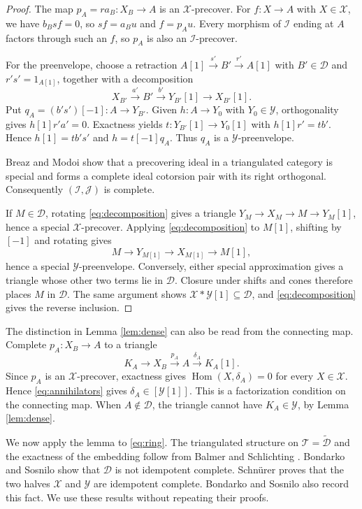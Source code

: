 \documentclass[11pt,a4paper,reqno]{amsart}
\newcommand{\Dcal}{\mathcal D}
\newcommand{\Ical}{\mathcal I}
\newcommand{\Tcal}{\mathcal T}
\newcommand{\Xcal}{\mathcal X}
\newcommand{\Hom}{\operatorname{Hom}}
\theoremstyle{plain}
\theoremstyle{definition}
\theoremstyle{remark}
\newcommand{\Jcal}{\mathcal J}
\newcommand{\Ycal}{\mathcal Y}
\begin{document}
\begin{proof}
The map $p_A=r a_B:X_B\to A$ is an $\Xcal$-precover. For $f:X\to A$ with $X\in\Xcal$, we have $b_Bsf=0$, so $sf=a_Bu$ and $f=p_Au$. Every morphism of $\Ical$ ending at $A$ factors through such an $f$, so $p_A$ is also an $\Ical$-precover.

For the preenvelope, choose a retraction $A[1]\xrightarrow{s'}B'\xrightarrow{r'}A[1]$ with $B'\in\Dcal$ and $r's'=1_{A[1]}$, together with a decomposition
$$
X_{B'}\xrightarrow{a'}B'\xrightarrow{b'}Y_{B'}[1]\longrightarrow X_{B'}[1].
$$
Put $q_A=(b's')[-1]:A\to Y_{B'}$. Given $h:A\to Y_0$ with $Y_0\in\Ycal$, orthogonality gives $h[1]r'a'=0$. Exactness yields $t:Y_{B'}[1]\to Y_0[1]$ with $h[1]r'=tb'$. Hence $h[1]=tb's'$ and $h=t[-1]q_A$. Thus $q_A$ is a $\Ycal$-preenvelope.

Breaz and Modoi \cite[Example~3.4.2 and Theorem~3.4.1]{BM21} show that a precovering ideal in a triangulated category is special and forms a complete ideal cotorsion pair with its right orthogonal. Consequently $(\Ical,\Jcal)$ is complete.

If $M\in\Dcal$, rotating \eqref{eq:decomposition} gives a triangle $Y_M\to X_M\to M\to Y_M[1]$, hence a special $\Xcal$-precover. Applying \eqref{eq:decomposition} to $M[1]$, shifting by $[-1]$ and rotating gives
$$
M\longrightarrow Y_{M[1]}\longrightarrow X_{M[1]}\longrightarrow M[1],
$$
hence a special $\Ycal$-preenvelope. Conversely, either special approximation gives a triangle whose other two terms lie in $\Dcal$. Closure under shifts and cones therefore places $M$ in $\Dcal$. The same argument shows $\Xcal*\Ycal[1]\subseteq\Dcal$, and \eqref{eq:decomposition} gives the reverse inclusion.
\end{proof}

The distinction in Lemma \ref{lem:dense} can also be read from the connecting map. Complete $p_A:X_B\to A$ to a triangle
$$
K_A\longrightarrow X_B\xrightarrow{p_A}A\xrightarrow{\delta_A}K_A[1].
$$
Since $p_A$ is an $\Xcal$-precover, exactness gives $\Hom(X,\delta_A)=0$ for every $X\in\Xcal$. Hence \eqref{eq:annihilators} gives $\delta_A\in[\Ycal[1]]$. This is a factorization condition on the connecting map. When $A\notin\Dcal$, the triangle cannot have $K_A\in\Ycal$, by Lemma \ref{lem:dense}.

We now apply the lemma to \eqref{eq:ring}. The triangulated structure on $\Tcal=\widetilde{\Dcal}$ and the exactness of the embedding follow from Balmer and Schlichting \cite[Theorem~1.5]{BS01}. Bondarko and Sosnilo \cite[Section~3.1]{BS18} show that $\Dcal$ is not idempotent complete. Schn\"urer \cite[Theorem~3.1]{Schn11} proves that the two halves $\Xcal$ and $\Ycal$ are idempotent complete. Bondarko and Sosnilo \cite[Proposition~1.1.2(1)]{BS18} also record this fact. We use these results without repeating their proofs.
\end{document}
